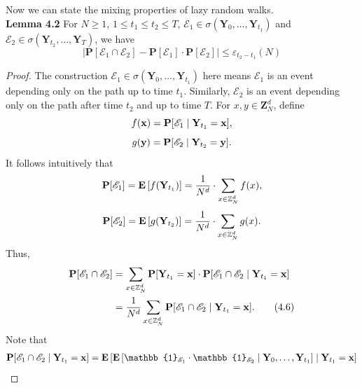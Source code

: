 \documentclass[
11pt, %
a4paper, %
oneside, %
headinclude,footinclude, %
BCOR5mm, %
]{scrartcl}
\begin{document}
Now we can state the mixing properties of lazy random walks.
\vspace{0.6em}\\\textbf{Lemma 4.2} For $N \geq 1$, $1 \leq t_1 \leq t_2 \leq T$, $\mathscr{E}_1 \in \sigma(\mathbf{Y}_0,\dots ,\mathbf{Y}_{t_1})$ and $\mathscr{E}_2 \in \sigma(\mathbf{Y}_{t_2},\dots ,\mathbf{Y}_T)$, we have
\begin{equation}
    \left| \mathbf{P}[\mathscr{E}_1 \cap \mathscr{E}_2] - \mathbf{P}[\mathscr{E}_1] \cdot \mathbf{P}[\mathscr{E}_2] \right| \leq \varepsilon_{t_2-t_1}(N) \tag{4.5}
\end{equation}
\begin{proof}
    The construction $\mathscr{E}_1 \in \sigma(\mathbf{Y}_0,\dots ,\mathbf{Y}_{t_1})$ here means $\mathscr{E}_1$ is an event depending only on the path up to time $t_1$. Similarly, $\mathscr{E}_2$ is an event depending only on the path after time $t_2$ and up to time $T$. For $x,y \in \mathbf{Z}_N^d$, define 
    \begin{equation}
        f(\mathbf{x})=\mathbf{P}[\mathscr{E}_1 \mid \mathbf{Y}_{t_1}=\mathbf{x}], \notag
    \end{equation}
    \begin{equation}
        g(\mathbf{y})=\mathbf{P}[\mathscr{E}_2 \mid \mathbf{Y}_{t_2}=\mathbf{y}]. \notag
    \end{equation}
    It follows intuitively that 
    \begin{equation}
        \mathbf{P}[\mathscr{E}_1]=\mathbf{E}\left[f(\mathbf{Y}_{t_1})\right]=\frac{1}{N^d} \cdot \sum_{x \in \mathbb{Z}_N^d}f(x), \notag
    \end{equation}
    \begin{equation}
        \mathbf{P}[\mathscr{E}_2]=\mathbf{E}\left[g(\mathbf{Y}_{t_2})\right]=\frac{1}{N^d} \cdot \sum_{x \in \mathbb{Z}_N^d}g(x). \notag
    \end{equation}
    Thus,
    \begin{align}
        \label{eq4.6}
        \mathbf{P}[\mathscr{E}_1 \cap \mathscr{E}_2] &= \sum_{x \in \mathbb{Z}_N^d} \mathbf{P}[\mathbf{Y}_{t_1}=\mathbf{x}]\cdot \mathbf{P}[\mathscr{E}_1 \cap \mathscr{E}_2 \mid \mathbf{Y}_{t_1}=\mathbf{x}] \notag \\
        &=\frac{1}{N^d}\sum_{x \in \mathbb{Z}_N^d} \mathbf{P}[\mathscr{E}_1 \cap \mathscr{E}_2 \mid \mathbf{Y}_{t_1}=\mathbf{x}]. \tag{4.6}
    \end{align}
    Note that 
    \begin{align}
        \mathbf{P}[\mathscr{E}_1 \cap \mathscr{E}_2 \mid \mathbf{Y}_{t_1}=\mathbf{x}] &= \mathbf{E}\left[ \mathbf{E} \left[ \mathbb{1}_{\mathscr{E}_1} \cdot \mathbb{1}_{\mathscr{E}_2} \mid \mathbf{Y}_0, \dots , \mathbf{Y}_{t_1}\right] \mid \mathbf{Y}_{t_1}=\mathbf{x}\right] \notag \\

\end{align}
\end{proof}
\end{document}

